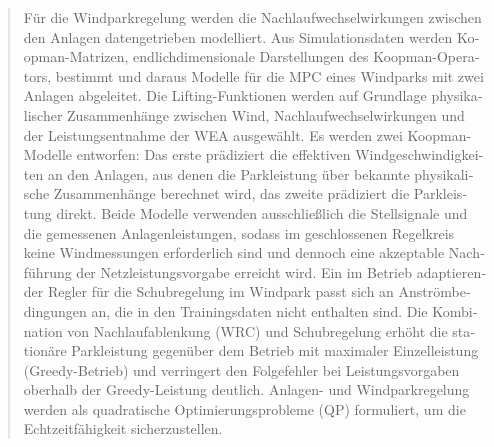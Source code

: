 \documentclass[12pt,a4paper,twoside]{report}
\begin{document}
\begin{otherlanguage}{ngerman}
{\begin{abstract}
Für die Windparkregelung werden die Nachlaufwechselwirkungen zwischen den Anlagen datengetrieben modelliert. Aus Simulationsdaten werden Koopman-Matrizen, endlichdimensionale Darstellungen des Koopman-Operators, bestimmt und daraus Modelle für die MPC eines Windparks mit zwei Anlagen abgeleitet. Die Lifting-Funktionen werden auf Grundlage physikalischer Zusammenhänge zwischen Wind, Nachlaufwechselwirkungen und der Leistungsentnahme der WEA ausgewählt. Es werden zwei Koopman-Modelle entworfen: Das erste prädiziert die effektiven Windgeschwindigkeiten an den Anlagen, aus denen die Parkleistung über bekannte physikalische Zusammenhänge berechnet wird, das zweite prädiziert die Parkleistung direkt. Beide Modelle verwenden ausschließlich die Stellsignale und die gemessenen Anlagenleistungen, sodass im geschlossenen Regelkreis keine Windmessungen erforderlich sind und dennoch eine akzeptable Nachführung der Netzleistungsvorgabe erreicht wird. Ein im Betrieb adaptierender Regler für die Schubregelung im Windpark passt sich an Anströmbedingungen an, die in den Trainingsdaten nicht enthalten sind. Die Kombination von Nachlaufablenkung (WRC) und Schubregelung erhöht die stationäre Parkleistung gegenüber dem Betrieb mit maximaler Einzelleistung (Greedy-Betrieb) und verringert den Folgefehler bei Leistungsvorgaben oberhalb der Greedy-Leistung deutlich. Anlagen- und Windparkregelung werden als quadratische Optimierungsprobleme (QP) formuliert, um die Echtzeitfähigkeit sicherzustellen.
  \end{abstract}}
\end{otherlanguage}

\cleardoublepage
\pagestyle{fancy}   %

\tableofcontents
    
\makeatletter
\begingroup
\let\addcontentsline\@gobblethree

\endgroup
\makeatother


    
    
    
    
    
    
    
    \appendix
    
   
    
    
    \cleardoublepage
 
     
     
\end{document}
